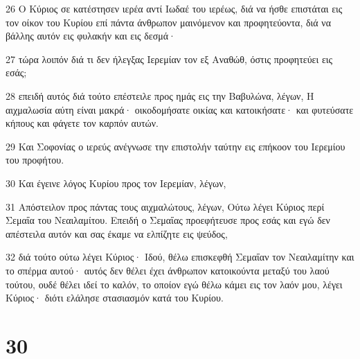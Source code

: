 \par 26 Ο Κύριος σε κατέστησεν ιερέα αντί Ιωδαέ του ιερέως, διά να ήσθε επιστάται εις τον οίκον του Κυρίου επί πάντα άνθρωπον μαινόμενον και προφητεύοντα, διά να βάλλης αυτόν εις φυλακήν και εις δεσμά·
\par 27 τώρα λοιπόν διά τι δεν ήλεγξας Ιερεμίαν τον εξ Αναθώθ, όστις προφητεύει εις εσάς;
\par 28 επειδή αυτός διά τούτο επέστειλε προς ημάς εις την Βαβυλώνα, λέγων, Η αιχμαλωσία αύτη είναι μακρά· οικοδομήσατε οικίας και κατοικήσατε· και φυτεύσατε κήπους και φάγετε τον καρπόν αυτών.
\par 29 Και Σοφονίας ο ιερεύς ανέγνωσε την επιστολήν ταύτην εις επήκοον του Ιερεμίου του προφήτου.
\par 30 Και έγεινε λόγος Κυρίου προς τον Ιερεμίαν, λέγων,
\par 31 Απόστειλον προς πάντας τους αιχμαλώτους, λέγων, Ούτω λέγει Κύριος περί Σεμαΐα του Νεαιλαμίτου. Επειδή ο Σεμαΐας προεφήτευσε προς εσάς και εγώ δεν απέστειλα αυτόν και σας έκαμε να ελπίζητε εις ψεύδος,
\par 32 διά τούτο ούτω λέγει Κύριος· Ιδού, θέλω επισκεφθή Σεμαΐαν τον Νεαιλαμίτην και το σπέρμα αυτού· αυτός δεν θέλει έχει άνθρωπον κατοικούντα μεταξύ του λαού τούτου, ουδέ θέλει ιδεί το καλόν, το οποίον εγώ θέλω κάμει εις τον λαόν μου, λέγει Κύριος· διότι ελάλησε στασιασμόν κατά του Κυρίου.

\chapter{30}

